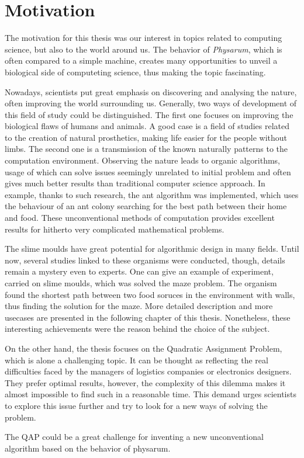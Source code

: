 \section{Motivation}
\label{section:introduction_motivation}

The motivation for this thesis was our interest in topics related to computing science, but also to the world around us. The behavior of \textit{Physarum}, which is often compared to a simple machine, creates many opportunities to unveil a biological side of computeting science, thus making the topic fascinating.

Nowadays, scientists put great emphasis on discovering and analysing the nature, often improving the world surrounding us. Generally, two ways of development of this field of study could be distinguished. The first one focuses on improving the biological flaws of humans and animals. A good case is a field of studies related to the creation of natural prosthetics, making life easier for the people without limbs. The second one is a transmission of the known naturally patterns to the computation environment. Observing the nature leads to organic algorithms, usage of which can solve issues seemingly unrelated to initial problem and often gives much better results than traditional computer science approach. In example, thanks to such research, the ant algorithm was implemented, which uses the behaviour of an ant colony searching for the best path between their home and food. These unconventional methods of computation provides excellent results for hitherto very complicated mathematical problems.

The slime moulds have great potential for algorithmic design in many fields. Until now, several studies linked to these organisms were conducted, though, details remain a mystery even to experts. One can give an example of experiment, carried on slime moulds, which was solved the maze problem. The organism found the shortest path between two food soruces in the environment with walls, thus finding the solution for the maze. More detailed description and more usecases are presented in the following chapter of this thesis. Nonetheless, these interesting achievements were the reason behind the choice of the subject.

On the other hand, the thesis focuses on the Quadratic Assignment Problem, which is alone a challenging topic. It can be thought as reflecting the real difficulties faced by the managers of logistics companies or electronics designers. They prefer optimal results, however, the complexity of this dilemma makes it almost impossible to find such in a reasonable time. This demand urges scientists to explore this issue further and try to look for a new ways of solving the problem. 

The QAP could be a great challenge for inventing a new unconventional algorithm based on the behavior of physarum. 
